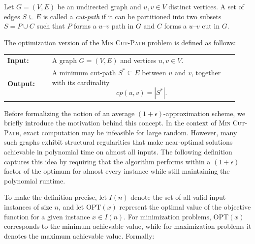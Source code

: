 \documentclass[journal ]{new-aiaa}
\numberwithin{equation}{section}
\theoremstyle{definition}
\theoremstyle{plain}
\theoremstyle{remark}
\begin{document}
\begin{problem}
Let $G=(V,E)$ be an undirected graph and $u,v \in V$ distinct vertices.  
A set of edges $S \subseteq E$ is called a \emph{cut-path} if it can be partitioned into two subsets $S = P \cup C$ such that $P$ forms a $u$--$v$ path in $G$ and $C$ forms a $u$--$v$ cut in $G$.  

The optimization version of the \textsc{Min Cut-Path} problem is defined as follows:

\begin{center}
\begin{tabular}{p{0.18\linewidth}p{0.75\linewidth}}
\textbf{Input:} & A graph $G=(V,E)$ and vertices $u,v \in V$. \\
\textbf{Output:} & A minimum cut-path $S ^* \subseteq E$ between $u$ and $v$, together with its cardinality
\[
cp(u,v) = |S^*|.
\]
\end{tabular}
\end{center}
\end{problem}


Before formalizing the notion of an average $(1+\epsilon)$-approximation scheme, we briefly introduce the motivation behind this concept. 
In the context of \textsc{Min Cut-Path}, exact computation may be infeasible for large random. 
However, many such graphs exhibit structural regularities that make near-optimal solutions achievable in polynomial time on almost all inputs. 
The following definition captures this idea by requiring that the algorithm performs within a $(1+\epsilon)$ factor of the optimum for almost every instance while still maintaining the polynomial runtime.

To make the definition precise, let $I(n)$ denote the set of all valid input instances of size $n$, and let $\mathrm{OPT}(x)$ represent the optimal value of the objective function for a given instance $x \in I(n)$. 
For minimization problems, $\mathrm{OPT}(x)$ corresponds to the minimum achievable value, while for maximization problems it denotes the maximum achievable value. Formally:
\end{document}
